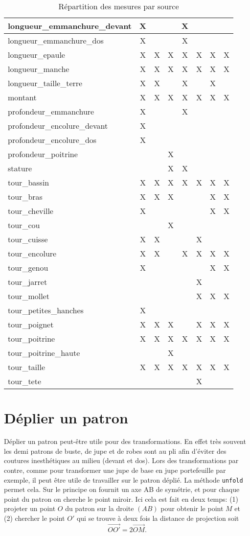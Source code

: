 \documentclass[10pt,a4paper,twoside]{report}
\begin{document}
\begin{table}
\begin{center}
\begin{tabular}{lccccccc}
longueur\_emmanchure\_devant&X&&&X&&&\\ \hline
longueur\_emmanchure\_dos&X&&&X&&&\\ \hline
longueur\_epaule&X&X&X&X&X&X&X\\ \hline
longueur\_manche&X&X&X&X&X&X&X\\ \hline
longueur\_taille\_terre&X&X&&X&&X&\\ \hline
montant&X&X&X&X&X&X&X\\ \hline
profondeur\_emmanchure&X&&&X&&&\\ \hline
profondeur\_encolure\_devant&X&&&&&&\\ \hline
profondeur\_encolure\_dos&X&&&&&&\\ \hline
profondeur\_poitrine&&&X&&&&\\ \hline
stature&&&X&X&&&\\ \hline
tour\_bassin&X&X&X&X&X&X&X\\ \hline
tour\_bras&X&X&X&&&X&X\\ \hline
tour\_cheville&X&&&&&X&X\\ \hline
tour\_cou&&&X&&&&\\ \hline
tour\_cuisse&X&X&&&X&&\\ \hline
tour\_encolure&X&X&&X&X&X&X\\ \hline
tour\_genou&X&&&&&X&X\\ \hline
tour\_jarret&&&&&X&&\\ \hline
tour\_mollet&&&&&X&X&X\\ \hline
tour\_petites\_hanches&X&&&&&&\\ \hline
tour\_poignet&X&X&X&&X&X&X\\ \hline
tour\_poitrine&X&X&X&X&X&X&X\\ \hline
tour\_poitrine\_haute&&&X&&&&\\ \hline
tour\_taille&X&X&X&X&X&X&X\\ \hline
tour\_tete&&&&&X&&\\ \hline
\end{tabular}
\end{center}
\label{tab:meas_det}
\caption{Répartition des mesures par source}
\end{table}




\section{Déplier un patron}
Déplier un patron peut-être utile pour des transformations. En effet très souvent les demi patrons de buste, de jupe et de robes sont au pli afin d'éviter des coutures inesthétiques au milieu (devant et dos). Lors des transformations par contre, comme pour transformer une jupe de base en jupe portefeuille par exemple, il peut être utile de travailler sur le patron déplié.   La méthode \texttt{unfold} permet cela. Sur le principe on fournit  un axe AB de symétrie, et pour chaque point du patron on cherche le point miroir. Ici cela est fait en deux temps: (1) projeter un point $O$ du patron sur la droite $(AB)$ pour obtenir le point $M$ et (2) chercher le point $O'$ qui se trouve à deux fois la distance de projection soit
$$\overrightarrow{OO'} = 2\overrightarrow{OM}.$$
\end{document}
